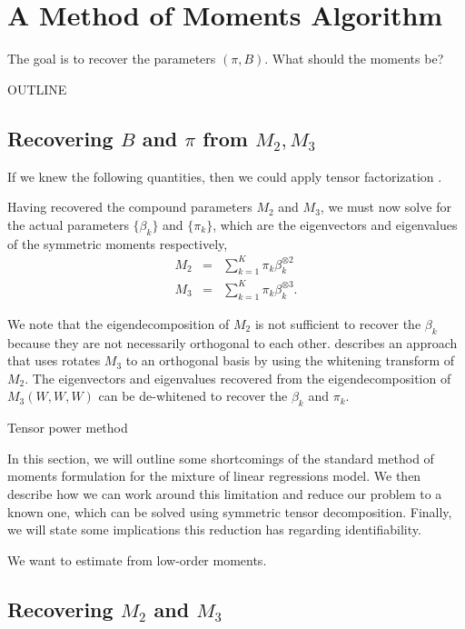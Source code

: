 \section{A Method of Moments Algorithm}
\label{sec:algo}

The goal is to recover the parameters $(\pi, B)$.
What should the moments be?

OUTLINE

\subsection{Recovering $B$ and $\pi$ from $M_2,M_3$}

If we knew the following quantities, then we could apply tensor factorization
\cite{AnandkumarGeHsu2012}.

Having recovered the compound parameters $M_2$ and $M_3$, we must now solve for the
actual parameters $\{\beta_k\}$ and $\{\pi_k\}$, which are the
eigenvectors and eigenvalues of the symmetric moments respectively,
\begin{eqnarray*}
  M_2 &=&  \sum_{k=1}^{K} \pi_k \beta_k^{\otimes 2}\\
  M_3 &=& \sum_{k=1}^{K} \pi_k \beta_k^{\otimes 3}.
\end{eqnarray*}

We note that the eigendecomposition of $M_2$ is not sufficient to
recover the $\beta_k$ because they are not necessarily orthogonal to
each other. \citet{AnandkumarGeHsu2012} describes an approach that uses
rotates $M_3$ to an orthogonal basis by using the whitening transform of
$M_2$. The eigenvectors and eigenvalues recovered from the
eigendecomposition of $M_3(W, W, W)$ can be de-whitened to recover the
$\beta_k$ and $\pi_k$.

Tensor power method

In this section, we will outline some shortcomings of the standard
method of moments formulation for the mixture of linear regressions
model. We then describe how we can work around this limitation and
reduce our problem to a known one, which can be solved using symmetric
tensor decomposition. Finally, we will state some implications this
reduction has regarding identifiability. 

We want to estimate from low-order moments.


\subsection{Recovering $M_2$ and $M_3$}

